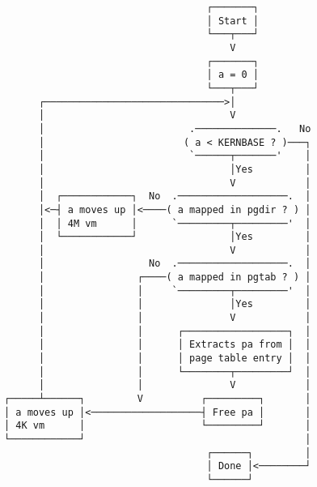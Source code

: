 \documentclass[varwidth,crop]{standalone}
\begin{document}
\begin{verbatim}
                                   ┌───────┐
                                   │ Start │
                                   └───┬───┘
                                       V
                                   ┌───────┐
                                   │ a = 0 │
                                   └───┬───┘
      ┌───────────────────────────────>│
      │                                V
      │                         .──────────────.   No
      │                        ( a < KERNBASE ? )───┐
      │                         `──────┬───────'    │
      │                                │Yes         │
      │                                V            │
      │  ┌────────────┐  No  .───────────────────.  │
      │<─┤ a moves up │<────( a mapped in pgdir ? ) │
      │  │ 4M vm      │      `─────────┬─────────'  │
      │  └────────────┘                │Yes         │
      │                                V            │
      │                  No  .───────────────────.  │
      │                ┌────( a mapped in pgtab ? ) │
      │                │     `─────────┬─────────'  │
      │                │               │Yes         │
      │                │               V            │
      │                │      ┌──────────────────┐  │
      │                │      │ Extracts pa from │  │
      │                │      │ page table entry │  │
      │                │      └────────┬─────────┘  │
      │                │               V            │
┌─────┴──────┐         V          ┌─────────┐       │
│ a moves up │<───────────────────┤ Free pa │       │
│ 4K vm      │                    └─────────┘       │
└────────────┘                                      │
                                   ┌──────┐         │
                                   │ Done │<────────┘
                                   └──────┘
\end{verbatim}
\end{document}
